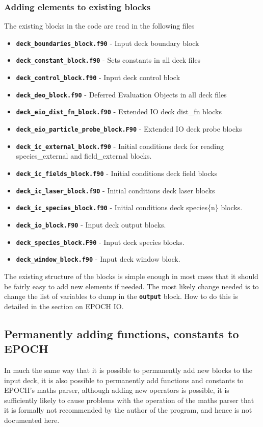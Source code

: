 \documentclass[12pt]{article}
\newcommand{\inlinecode}[1]{{\color{warwickred} \bf\texttt{#1}}}
\newcommand{\EPOCH}{{\color{warwickdark}\fontfamily{phv}\selectfont EPOCH} }
\begin{document}
\subsubsection{Adding elements to existing blocks}
The existing blocks in the code are read in the following files
\begin{itemize}
\item \inlinecode{deck\_boundaries\_block.f90} - Input deck boundary block
\item \inlinecode{deck\_constant\_block.f90} - Sets constants in all deck files
\item \inlinecode{deck\_control\_block.f90} - Input deck control block
\item \inlinecode{deck\_deo\_block.f90} - Deferred Evaluation Objects in all
  deck files
\item \inlinecode{deck\_eio\_dist\_fn\_block.f90} - Extended IO deck dist\_fn
  blocks
\item \inlinecode{deck\_eio\_particle\_probe\_block.F90} - Extended IO deck
  probe blocks
\item \inlinecode{deck\_ic\_external\_block.f90} - Initial conditions deck for
  reading species\_external and field\_external blocks.
\item \inlinecode{deck\_ic\_fields\_block.f90} - Initial conditions deck field
  blocks
\item \inlinecode{deck\_ic\_laser\_block.f90} - Initial conditions deck laser
  blocks
\item \inlinecode{deck\_ic\_species\_block.f90} - Initial conditions deck
  species\{n\} blocks.
\item \inlinecode{deck\_io\_block.F90} - Input deck output blocks.
\item \inlinecode{deck\_species\_block.F90} - Input deck species blocks.
\item \inlinecode{deck\_window\_block.f90} - Input deck window block.
\end{itemize}

The existing structure of the blocks is simple enough in most cases that it
should be fairly easy to add new elements if needed. The most likely change
needed is to change the list of variables to dump in the \inlinecode{output}
block. How to do this is detailed in the section on \EPOCH IO.

\subsection{Permanently adding functions, constants to \EPOCH}
In much the same way that it is possible to permanently add new blocks to the
input deck, it is also possible to permanently add functions and constants to
EPOCH's maths parser, although adding new operators is possible, it is
sufficiently likely to cause problems with the operation of the maths parser
that it is formally not recommended by the author of the program, and hence is
not documented here.
\end{document}

